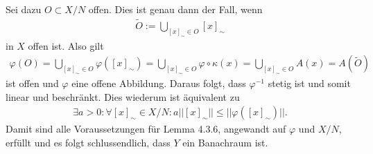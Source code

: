 \begin{solution}
\begin{enumerate}[label = (\roman*)]
  Sei dazu $O \subset X/N$ offen. Dies ist genau dann der Fall, wenn
  \begin{align*}
     \widetilde{O} :=\bigcup_{[x]_\sim \in O} [x]_{\sim}
  \end{align*}
  in $X$ offen ist. Also gilt
  \begin{align*}
    \varphi(O) = \bigcup_{[x]_\sim \in O} \varphi([x]_{\sim})
    = \bigcup_{[x]_\sim \in O} \varphi \circ \kappa(x)
    = \bigcup_{[x]_\sim \in O} A(x)
    = A(\widetilde{O})
  \end{align*}
  ist offen und $\varphi$ eine offene Abbildung. Daraus folgt, dass $\varphi^{-1}$
  stetig ist und somit linear und beschränkt. Dies wiederum ist äquivalent zu
  \begin{align*}
    \exists a > 0: \forall [x]_\sim \in X/N: a||[x]_\sim|| \leq ||\varphi([x]_\sim)||.
  \end{align*}
  Damit sind alle Voraussetzungen für Lemma 4.3.6, angewandt auf $\varphi$ und $X/N$, erfüllt
  und es folgt schlussendlich, dass $Y$ ein Banachraum ist.
\end{enumerate}
\end{solution}
